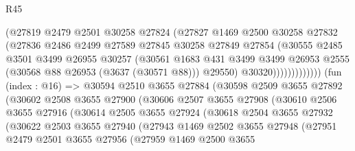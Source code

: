 \begin{lexlean}{R45}
\begin{coremodule}
                          (@27819
                            @2479
                            @2501
                            @30258
                            @27824
                            (@27827
                              @1469
                              @2500
                              @30258
                              @27832
                              (@27836
                                @2486
                                @2499
                                @27589
                                @27845
                                @30258
                                @27849
                                @27854
                                (@30555
                                  @2485
                                  @3501
                                  @3499
                                  @26955
                                  @30257
                                  (@30561
                                    @1683
                                    @431
                                    @3499
                                    @3499
                                    @26953
                                    @2555
                                    (@30568 @88 @26953 (@3637 (@30571 @88)))
                                    @29550)
                                  @30320)))))))))))))
        (fun (index : @16) =>
        @30594
          @2510
          @3655
          @27884
          (@30598
            @2509
            @3655
            @27892
            (@30602
              @2508
              @3655
              @27900
              (@30606
                @2507
                @3655
                @27908
                (@30610
                  @2506
                  @3655
                  @27916
                  (@30614
                    @2505
                    @3655
                    @27924
                    (@30618
                      @2504
                      @3655
                      @27932
                      (@30622
                        @2503
                        @3655
                        @27940
                        (@27943
                          @1469
                          @2502
                          @3655
                          @27948
                          (@27951
                            @2479
                            @2501
                            @3655
                            @27956
                            (@27959
                              @1469
                              @2500
                              @3655

\end{coremodule}
\end{lexlean}
